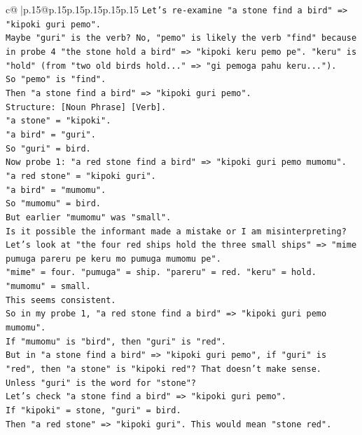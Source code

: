 \documentclass{article}
\begin{document}
{\begin{supertabular}{c@{$\;$}|p{.15\linewidth}@{}p{.15\linewidth}p{.15\linewidth}p{.15\linewidth}p{.15\linewidth}p{.15\linewidth}}
{{{\texttt{Let's re{-}examine "a stone find a bird" => "kipoki guri pemo".} \\
\texttt{Maybe "guri" is the verb? No, "pemo" is likely the verb "find" because in probe 4 "the stone hold a bird" => "kipoki keru pemo pe". "keru" is "hold" (from "two old birds hold..." => "gi pemoga pahu keru...").} \\
\texttt{So "pemo" is "find".} \\
\texttt{Then "a stone find a bird" => "kipoki guri pemo".} \\
\texttt{Structure: {[}Noun Phrase{]} {[}Verb{]}.} \\
\texttt{"a stone" = "kipoki".} \\
\texttt{"a bird" = "guri".} \\
\texttt{So "guri" = bird.} \\
\texttt{Now probe 1: "a red stone find a bird" => "kipoki guri pemo mumomu".} \\
\texttt{"a red stone" = "kipoki guri".} \\
\texttt{"a bird" = "mumomu".} \\
\texttt{So "mumomu" = bird.} \\
\texttt{But earlier "mumomu" was "small".} \\
\texttt{Is it possible the informant made a mistake or I am misinterpreting?} \\
\texttt{Let's look at "the four red ships hold the three small ships" => "mime pumuga pareru pe keru mo pumuga mumomu pe".} \\
\texttt{"mime" = four. "pumuga" = ship. "pareru" = red. "keru" = hold. "mumomu" = small.} \\
\texttt{This seems consistent.} \\
\texttt{So in my probe 1, "a red stone find a bird" => "kipoki guri pemo mumomu".} \\
\texttt{If "mumomu" is "bird", then "guri" is "red".} \\
\texttt{But in "a stone find a bird" => "kipoki guri pemo", if "guri" is "red", then "a stone" is "kipoki red"? That doesn't make sense.} \\
\texttt{Unless "guri" is the word for "stone"?} \\
\texttt{Let's check "a stone find a bird" => "kipoki guri pemo".} \\
\texttt{If "kipoki" = stone, "guri" = bird.} \\
\texttt{Then "a red stone" => "kipoki guri". This would mean "stone red".} \\
}}}
\end{supertabular}}
\end{document}
